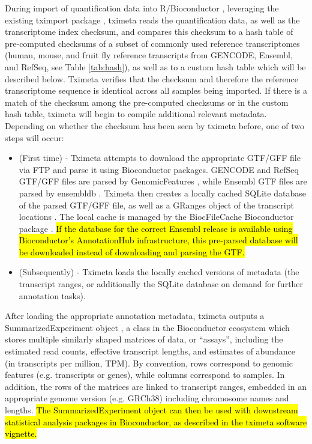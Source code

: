 During import of quantification data into R/Bioconductor
\cite{bioc}, leveraging the existing tximport package
\cite{tximport}, tximeta reads the quantification data, as well as
the transcriptome index checksum, and compares this checksum to a hash
table of pre-computed checksums of a subset of commonly used reference
transcriptomes (human, mouse, and fruit fly reference transcripts from
GENCODE, Ensembl, and RefSeq, see Table \ref{tab:hash}), as well as to a
custom hash table which will be described below. Tximeta verifies that
the checksum and therefore the reference transcriptome sequence is
identical across all samples being imported. If there is a match of
the checksum among the pre-computed checksums or in the custom hash table,
tximeta will begin to compile additional relevant
metadata. Depending on whether the checksum has been seen by tximeta
before, one of two steps will occur:

\begin{itemize}
\item (First time) - Tximeta attempts to download the appropriate GTF/GFF
  file via FTP and parse it using Bioconductor packages. 
  GENCODE and RefSeq GTF/GFF files are parsed
  by GenomicFeatures \cite{granges}, while Ensembl GTF files are
  parsed by ensembldb \cite{ensembldb}. Tximeta then creates a
  locally cached SQLite database of the parsed GTF/GFF file, as well as a
  GRanges object of the transcript locations \cite{granges}. The
  local cache is managed by the BiocFileCache Bioconductor package
  \cite{biocfilecache}. \hl{If the database for the correct Ensembl
    release is available using Bioconductor's AnnotationHub
    infrastructure, this pre-parsed database will be downloaded
    instead of downloading and parsing the GTF.}
\item (Subsequently) - Tximeta loads the locally cached versions of
  metadata (the transcript ranges, or additionally the SQLite database
  on demand for further annotation tasks).
\end{itemize}

After loading the appropriate annotation metadata, tximeta outputs a
SummarizedExperiment object \cite{granges}, a class in the
Bioconductor ecosystem which stores multiple similarly shaped matrices
of data, or ``assays'', including the estimated read counts, effective
transcript lengths, and estimates of abundance (in transcripts per
million, TPM). By convention, rows correspond to genomic features
(e.g. transcripts or genes), while columns correspond to samples. In
addition, the rows of the matrices are linked to transcript ranges,
embedded in an appropriate genome version (e.g. GRCh38) including
chromosome names and lengths. \hl{The SummarizedExperiment object can
then be used with downstream statistical analysis packages in
Bioconductor, as described in the tximeta software vignette.}

